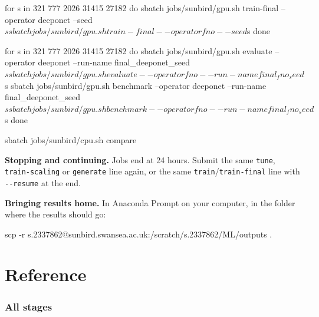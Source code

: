 \documentclass[11pt,a4paper]{article}
\newcommand{\code}[1]{\lstinline{#1}}
\begin{document}
\begin{cmd}
for s in 321 777 2026 31415 27182
do
    sbatch jobs/sunbird/gpu.sh train-final --operator deeponet --seed $s
    sbatch jobs/sunbird/gpu.sh train-final --operator fno      --seed $s
done
\end{cmd}

\begin{cmd}
for s in 321 777 2026 31415 27182
do
    sbatch jobs/sunbird/gpu.sh evaluate  --operator deeponet --run-name final_deeponet_seed$s
    sbatch jobs/sunbird/gpu.sh evaluate  --operator fno      --run-name final_fno_seed$s
    sbatch jobs/sunbird/gpu.sh benchmark --operator deeponet --run-name final_deeponet_seed$s
    sbatch jobs/sunbird/gpu.sh benchmark --operator fno      --run-name final_fno_seed$s
done
\end{cmd}

\begin{cmd}
sbatch jobs/sunbird/cpu.sh compare
\end{cmd}

\textbf{Stopping and continuing.} Jobs end at 24 hours. Submit the same \code{tune},
\code{train-scaling} or \code{generate} line again, or the same \code{train}/\code{train-final}
line with \code{--resume} at the end.

\textbf{Bringing results home.} In Anaconda Prompt on your computer, in the folder where the
results should go:

\begin{cmd}
scp -r s.2337862@sunbird.swansea.ac.uk:/scratch/s.2337862/ML/outputs .
\end{cmd}

\part{Reference}

\section{All stages}
\end{document}
